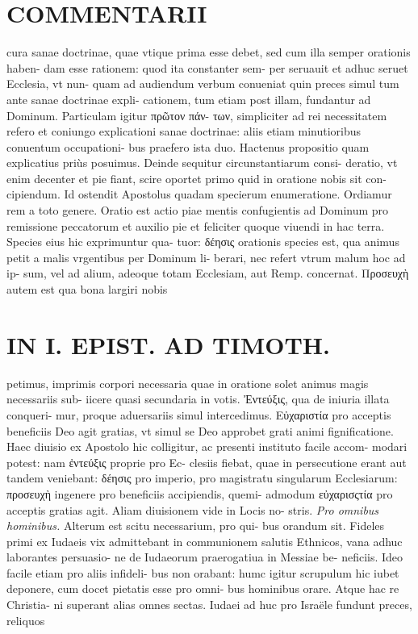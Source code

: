 \documentclass{article}
\begin{document}
\begin{pages}
\section*{COMMENTARII }
\marginpar{[ p.44 ]}\pstart cura sanae doctrinae, quae vtique prima esse debet, sed cum illa semper orationis haben- dam esse rationem: quod ita constanter sem- per seruauit et adhuc seruet Ecclesia, vt nun- quam ad audiendum verbum conueniat quin preces simul tum ante sanae doctrinae expli- cationem, tum etiam post illam, fundantur ad Dominum. Particulam igitur πρῶτον πάν- των, simpliciter ad rei necessitatem refero et coniungo explicationi sanae doctrinae: aliis etiam minutioribus conuentum occupationi- bus praefero ista duo. Hactenus propositio quam explicatius priùs posuimus.  \pend\pstart Deinde sequitur circunstantiarum consi- deratio, vt enim decenter et pie fiant, scire oportet primo quid in oratione nobis sit con- cipiendum. Id ostendit Apostolus quadam specierum enumeratione. Ordiamur rem a toto genere.  \pend\pstart Oratio est actio piae mentis confugientis ad Dominum pro remissione peccatorum et auxilio pie et feliciter quoque viuendi in hac terra. Species eius hic exprimuntur qua- tuor: δέησις orationis species est, qua animus petit a malis vrgentibus per Dominum li- berari, nec refert vtrum malum hoc ad ip- sum, vel ad alium, adeoque totam Ecclesiam, aut Remp. concernat. Προσευχὴ autem est qua bona largiri nobis  \pend
\section*{IN I. EPIST. AD TIMOTH. }
\marginpar{[ p.45 ]}\pstart petimus, imprimis corpori necessaria quae in oratione solet animus magis necessariis sub- iicere quasi secundaria in votis.  \pend\pstart Ἐντεύξις, qua de iniuria illata conqueri- mur, proque aduersariis simul intercedimus. Εὐχαριστία pro acceptis beneficiis Deo agit gratias, vt simul se Deo approbet grati animi fignificatione. Haec diuisio ex Apostolo hic colligitur, ac presenti instituto facile accom- modari potest: nam ἐντεύξις proprie pro Ec- clesiis fiebat, quae in persecutione erant aut tandem veniebant: δέησις pro imperio, pro magistratu singularum Ecclesiarum: προσευχὴ ingenere pro beneficiis accipiendis, quemi- admodum εὐχαρισςτία pro acceptis gratias agit. Aliam diuisionem vide in Locis no- stris.  \pend
\textit{Pro omnibus hominibus. }\pstart Alterum est scitu necessarium, pro qui- bus orandum sit. Fideles primi ex Iudaeis vix admittebant in communionem salutis Ethnicos, vana adhuc laborantes persuasio- ne de Iudaeorum praerogatiua in Messiae be- neficiis. Ideo facile etiam pro aliis infideli- bus non orabant: humc igitur scrupulum hic iubet deponere, cum docet pietatis esse pro omni- bus hominibus orare. Atque hac re Christia- ni superant alias omnes sectas. Iudaei ad huc pro Israële fundunt preces, reliquos  \pend
\marginpar{[ p.46 ]}

\end{pages}
\end{document}
